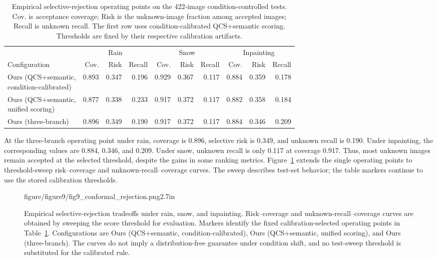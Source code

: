 \begin{table}[!t]
  \centering
  \caption{Empirical selective-rejection operating points on the 422-image
  condition-controlled tests. Cov. is acceptance coverage; Risk is the
  unknown-image fraction among accepted images; Recall is unknown recall.
  The first row uses condition-calibrated QCS+semantic scoring.
  Thresholds are fixed by their respective calibration artifacts.}
  \label{tab:conformal}
  {\QSDexpTableStyle
  \begin{tabular*}{\textwidth}{@{\extracolsep{\fill}}lrrrrrrrrr@{}}
    \toprule
    & \multicolumn{3}{c}{Rain} & \multicolumn{3}{c}{Snow}
    & \multicolumn{3}{c}{Inpainting} \\
    \cmidrule(lr){2-4}\cmidrule(lr){5-7}\cmidrule(lr){8-10}
    Configuration & Cov. & Risk & Recall & Cov. & Risk & Recall
    & Cov. & Risk & Recall \\
    \midrule
    \shortstack[l]{Ours (QCS+semantic,\\condition-calibrated)}
      & 0.893 & 0.347 & 0.196 & 0.929 & 0.367 & 0.117 & 0.884 & 0.359 & 0.178 \\
    \shortstack[l]{Ours (QCS+semantic,\\unified scoring)}
      & 0.877 & 0.338 & 0.233 & 0.917 & 0.372 & 0.117 & 0.882 & 0.358 & 0.184 \\
    Ours (three-branch)
      & 0.896 & 0.349 & 0.190 & 0.917 & 0.372 & 0.117 & 0.884 & 0.346 & 0.209 \\
    \bottomrule
  \end{tabular*}}
\end{table}

At the three-branch operating point under rain, coverage is 0.896, selective
risk is 0.349, and unknown recall is 0.190. Under inpainting, the corresponding
values are 0.884, 0.346, and 0.209. Under snow, unknown recall is only 0.117
at coverage 0.917. Thus, most unknown images remain accepted at the selected
threshold, despite the gains in some ranking metrics. Figure~\ref{fig:conformal}
extends the single operating points to threshold-sweep risk--coverage and
unknown-recall--coverage curves. The sweep describes test-set behavior;
the table markers continue to use the stored calibration thresholds.

\begin{figure}[!t]
  \centering
    {figure/figure9/fig9_conformal_rejection.png}{2.7in}
  \caption{Empirical selective-rejection tradeoffs under rain, snow, and
  inpainting. Risk--coverage and unknown-recall--coverage curves are obtained
  by sweeping the score threshold for evaluation. Markers identify the fixed
  calibration-selected operating points in Table~\ref{tab:conformal}.
  Configurations are Ours (QCS+semantic, condition-calibrated), Ours
  (QCS+semantic, unified scoring), and Ours (three-branch).
  The curves do not imply a distribution-free guarantee under condition
  shift, and no test-sweep threshold is substituted for the calibrated rule.}
  \label{fig:conformal}
\end{figure}

